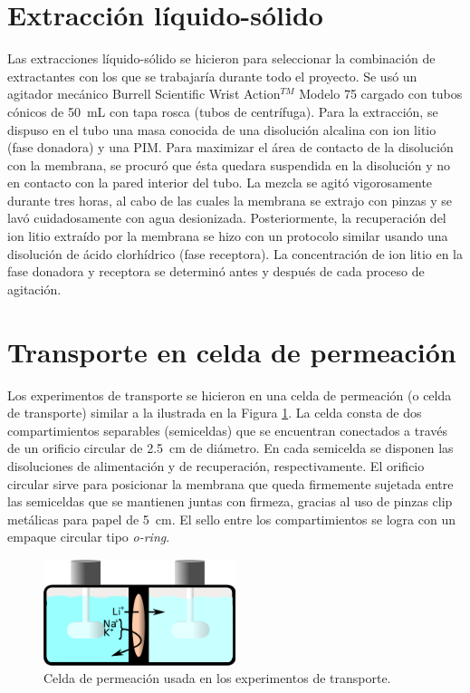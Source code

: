 \section{Extracción líquido-sólido}\label{sec:liqsolex}
Las extracciones líquido-sólido se hicieron para seleccionar la combinación de extractantes con los que se trabajaría durante todo el proyecto. Se usó un agitador mecánico Burrell Scientific Wrist Action$^{TM}$ Modelo 75 cargado con tubos cónicos de 50~mL con tapa rosca (tubos de centrífuga). Para la extracción, se dispuso en el tubo una masa conocida de una disolución alcalina con ion litio (fase donadora) y una \ac{PIM}. Para maximizar el área de contacto de la disolución con la membrana, se procuró que ésta quedara suspendida en la disolución y no en contacto con la pared interior del tubo. La mezcla se agitó vigorosamente durante tres horas, al cabo de las cuales la membrana se extrajo con pinzas y se lavó cuidadosamente con agua desionizada. Posteriormente, la recuperación del ion litio extraído por la membrana se hizo con un protocolo similar usando una disolución de ácido clorhídrico (fase receptora). La concentración de ion litio en la fase donadora y receptora se determinó antes y después de cada proceso de agitación.

\section{Transporte en celda de permeación}
Los experimentos de transporte se hicieron en una celda de permeación (o celda de transporte) similar a la ilustrada en la Figura \ref{fig:celda}. La celda consta de dos compartimientos separables (semiceldas) que se encuentran conectados a través de un orificio circular de 2.5~cm de diámetro. En cada semicelda se disponen las disoluciones de alimentación y de recuperación, respectivamente. El orificio circular sirve para posicionar la membrana que queda firmemente sujetada entre las semiceldas que se mantienen juntas con firmeza, gracias al uso de pinzas clip metálicas para papel de 5~cm. El sello entre los compartimientos se logra con un empaque circular tipo \textit{o-ring}.

\begin{figure}[H]
    \centering
    \includegraphics[width=0.5\textwidth]{chap3/PermCell}
    \caption{Celda de permeación usada en los experimentos de transporte.}
    \label{fig:celda}
\end{figure}

